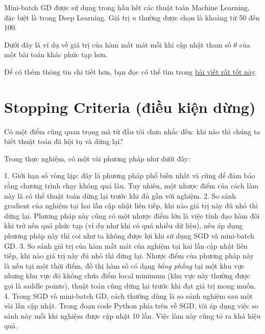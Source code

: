 Mini-batch GD được sử dụng trong hầu hết các thuật toán Machine Learning, đặc biệt là trong Deep Learning. Giá trị $n$ thường được chọn là khoảng từ 50 đến 100. 
 
Dưới đây là ví dụ về giá trị của hàm mất mát mỗi khi cập nhật tham số $\theta$ của một bài toán khác phức tạp hơn. 
 
 
Để có thêm thông tin chi tiết hơn, bạn đọc có thể tìm trong \href{http://sebastianruder.com/optimizing-gradient-descent/index.html#stochasticgradientdescent}{bài viết rất tốt này}.  
 
 
 
 
\section{Stopping Criteria (điều kiện dừng)}
 
Có một điểm cũng quan trọng mà từ đầu tôi chưa nhắc đến: khi nào thì chúng ta biết thuật toán đã hội tụ và dừng lại? 
 
Trong thực nghiệm, có một vài phương pháp như dưới đây: 
 
1. Giới hạn số vòng lặp: đây là phương pháp phổ biến nhất và cũng để đảm bảo rằng chương trình chạy không quá lâu. Tuy nhiên, một nhược điểm của cách làm này là có thể thuật toán dừng lại trước khi đủ gần với nghiệm.  
2. So sánh gradient của nghiệm tại hai lần cập nhật liên tiếp, khi nào giá trị này đủ nhỏ thì dừng lại. Phương pháp này cũng có một nhược điểm lớn là việc tính đạo hàm đôi khi trở nên quá phức tạp (ví dụ như khi có quá nhiều dữ liệu), nếu áp dụng phương pháp này thì coi như ta không được lợi khi sử dụng SGD và mini-batch GD.  
3. So sánh giá trị của hàm mất mát của nghiệm tại hai lần cập nhật liên tiếp, khi nào giá trị này đủ nhỏ thì dừng lại. Nhược điểm của phương pháp này là nếu tại một thời điểm, đồ thị hàm số có dạng \textit{bẳng phẳng} tại một khu vực nhưng khu vực đó không chứa điểm local minimum (khu vực này thường được gọi là saddle points), thuật toán cũng dừng lại trước khi đạt giá trị mong muốn.  
4. Trong SGD và mini-batch GD, cách thường dùng là so sánh nghiệm sau một vài lần cập nhật. Trong đoạn code Python phía trên về SGD, tôi áp dụng việc so sánh này mỗi khi nghiệm được cập nhật 10 lần. Việc làm này cũng tỏ ra khá hiệu quả.  
 
